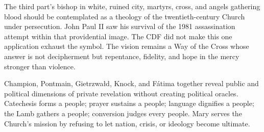 The third part's bishop in white, ruined city, martyrs, cross, and angels gathering blood should be contemplated as a theology of the twentieth-century Church under persecution. John Paul II saw his survival of the 1981 assassination attempt within that providential image. The CDF did not make this one application exhaust the symbol. The vision remains a Way of the Cross whose answer is not decipherment but repentance, fidelity, and hope in the mercy stronger than violence.

Champion, Pontmain, Gietrzwałd, Knock, and Fátima together reveal public and political dimensions of private revelation without creating political oracles. Catechesis forms a people; prayer sustains a people; language dignifies a people; the Lamb gathers a people; conversion judges every people. Mary serves the Church's mission by refusing to let nation, crisis, or ideology become ultimate.
